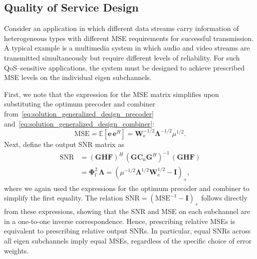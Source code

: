 \subsection{Quality of Service Design}
\label{section:quality_of_service_design}
Consider an application in which different data streams carry information of heterogeneous types with different \ac{MSE} requirements for successful transmission. 
A typical example is a multimedia system in which audio and video streams are transmitted simultaneously but require different levels of reliability.
For such \acf{QoS}--sensitive applications, the system must be designed to achieve prescribed \ac{MSE} levels on the individual eigen subchannels.

First, we note that the expression for the \ac{MSE} matrix simplifies upon substituting the optimum precoder and combiner from~\eqref{eq:solution_generalized_design_precoder} and~\eqref{eq:solution_generalized_design_combiner}:
\begin{equation}
\label{eq:mse_matrix_simplified}
    \text{MSE} 
    = \mathbb{E}\!\left[\mathbf{e}\, \mathbf{e}^H\right]
    = \mathbf{W}^{-1/2}_{\mathrm{e}} \mathbf{\Lambda}^{- 1/2} \mu^{1/2}.
\end{equation}
Next, define the output \ac{SNR} matrix as
\begin{subequations}
\label{eq:snr_matrix}
\begin{align}
    \text{SNR} 
    &= (\mathbf{G}\mathbf{H}\mathbf{F})^H \, (\mathbf{G} \mathbf{C}_{\mathrm{n}} \mathbf{G}^H)^{-1} \, (\mathbf{G}\mathbf{H}\mathbf{F}) \\
    &= \mathbf{\Phi}^2_{\mathrm{f}} \, \mathbf{\Lambda} = (\mu^{-1/2} \mathbf{\Lambda}^{1/2} \mathbf{W}^{1/2}_{\mathrm{e}} - \mathbf{I})_{+},
\end{align}
\end{subequations}
where we again used the expressions for the optimum precoder and combiner to simplify the first equality.
The relation $\text{SNR} = (\text{MSE}^{-1} - \mathbf{I})_{+}$ follows directly from these expressions, showing that the \ac{SNR} and \ac{MSE} on each subchannel are in a one-to-one inverse correspondence.
Hence, prescribing relative \acp{MSE} is equivalent to prescribing relative output \acp{SNR}.
In particular, equal \acp{SNR} across all eigen subchannels imply equal \acp{MSE}, regardless of the specific choice of error weights.

